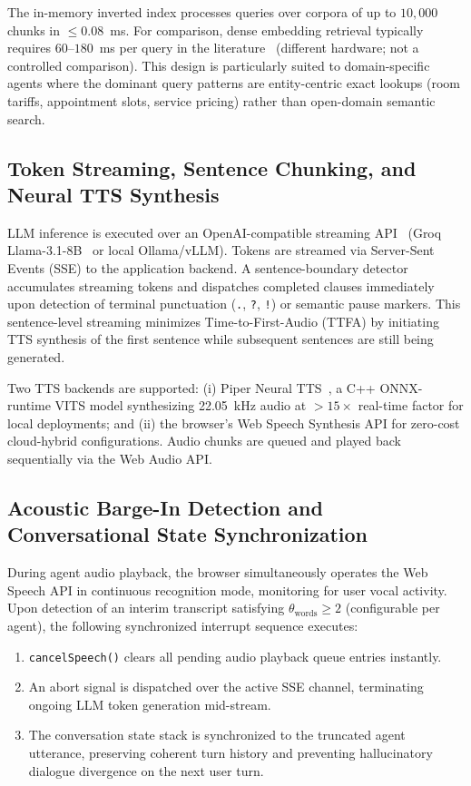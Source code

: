 \documentclass[11pt,a4paper]{article}
\begin{document}
The in-memory inverted index processes queries over corpora of up to $10{,}000$ chunks in $\le 0.08$~ms. For comparison, dense embedding retrieval typically requires $60$--$180$~ms per query in the literature~\cite{izacard2022unsupervised} (different hardware; not a controlled comparison). This design is particularly suited to domain-specific agents where the dominant query patterns are entity-centric exact lookups (room tariffs, appointment slots, service pricing) rather than open-domain semantic search.

\subsection{Token Streaming, Sentence Chunking, and Neural TTS Synthesis}
\label{subsec:streaming}

LLM inference is executed over an OpenAI-compatible streaming API~\cite{openai2023gpt4} (Groq Llama-3.1-8B~\cite{touvron2023llama} or local Ollama/vLLM). Tokens are streamed via Server-Sent Events (SSE) to the application backend. A sentence-boundary detector accumulates streaming tokens and dispatches completed clauses immediately upon detection of terminal punctuation (\texttt{.}, \texttt{?}, \texttt{!}) or semantic pause markers. This sentence-level streaming minimizes Time-to-First-Audio (TTFA) by initiating TTS synthesis of the first sentence while subsequent sentences are still being generated.

Two TTS backends are supported: (i) Piper Neural TTS~\cite{piper2023tts}, a C++ ONNX-runtime VITS model synthesizing 22.05~kHz audio at $>15\times$ real-time factor for local deployments; and (ii) the browser's Web Speech Synthesis API for zero-cost cloud-hybrid configurations. Audio chunks are queued and played back sequentially via the Web Audio API.

\subsection{Acoustic Barge-In Detection and Conversational State Synchronization}
\label{subsec:bargein}

During agent audio playback, the browser simultaneously operates the Web Speech API in continuous recognition mode, monitoring for user vocal activity. Upon detection of an interim transcript satisfying $\theta_{\text{words}} \ge 2$ (configurable per agent), the following synchronized interrupt sequence executes:

\begin{enumerate}[leftmargin=*]
    \item \texttt{cancelSpeech()} clears all pending audio playback queue entries instantly.
    \item An abort signal is dispatched over the active SSE channel, terminating ongoing LLM token generation mid-stream.
    \item The conversation state stack is synchronized to the truncated agent utterance, preserving coherent turn history and preventing hallucinatory dialogue divergence on the next user turn.
\end{enumerate}
\end{document}
